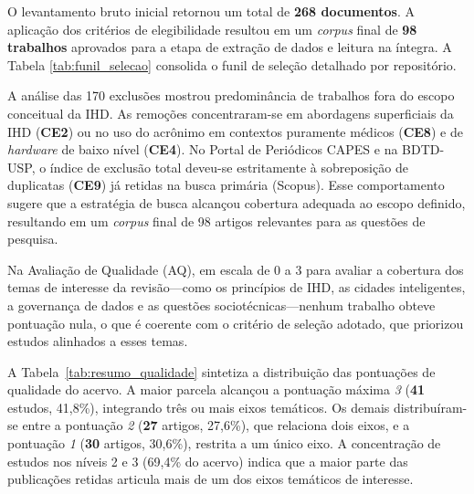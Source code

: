 \documentclass[12pt]{article}
\begin{document}
O levantamento bruto inicial retornou um total de \textbf{268 documentos}. A aplicação dos critérios de elegibilidade resultou em um \textit{corpus} final de \textbf{98 trabalhos} aprovados para a etapa de extração de dados e leitura na íntegra. A Tabela \ref{tab:funil_selecao} consolida o funil de seleção detalhado por repositório.

\begin{table}[H]
\centering
\caption{Consolidação do Funil de Seleção de Estudos por Base de Dados}
\label{tab:funil_selecao}
\small
{}
\end{table}
\vspace{-0.1 cm} 

A análise das 170 exclusões mostrou predominância de trabalhos fora do escopo conceitual da IHD. As remoções concentraram-se em abordagens superficiais da IHD (\textbf{CE2}) ou no uso do acrônimo em contextos puramente médicos (\textbf{CE8}) e de \textit{hardware} de baixo nível (\textbf{CE4}). No Portal de Periódicos CAPES e na BDTD-USP, o índice de exclusão total deveu-se estritamente à sobreposição de duplicatas (\textbf{CE9}) já retidas na busca primária (Scopus). Esse comportamento sugere que a estratégia de busca alcançou cobertura adequada ao escopo definido, resultando em um \textit{corpus} final de 98 artigos relevantes para as questões de pesquisa.

Na Avaliação de Qualidade (AQ), em escala de 0 a 3 para avaliar a cobertura dos temas de interesse da revisão---como os princípios de IHD, as cidades inteligentes, a governança de dados e as questões sociotécnicas---nenhum trabalho obteve pontuação nula, o que é coerente com o critério de seleção adotado, que priorizou estudos alinhados a esses temas.

A Tabela~\ref{tab:resumo_qualidade} sintetiza a distribuição das pontuações de qualidade do acervo. A maior parcela alcançou a pontuação máxima \emph{3} (\textbf{41} estudos, 41,8\%), integrando três ou mais eixos temáticos. Os demais distribuíram-se entre a pontuação \emph{2} (\textbf{27} artigos, 27,6\%), que relaciona dois eixos, e a pontuação \emph{1} (\textbf{30} artigos, 30,6\%), restrita a um único eixo. A concentração de estudos nos níveis 2 e 3 (69,4\% do acervo) indica que a maior parte das publicações retidas articula mais de um dos eixos temáticos de interesse.
\end{document}

